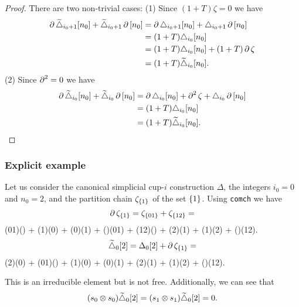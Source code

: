 \begin{proof}
	There are two non-trivial cases:
	(1) Since $(1+T) \zeta = 0$ we have
	\begin{align*}
		\operatorname{\partial} \widetilde\triangle_{i_0+1}[n_0] + \widetilde\triangle_{i_0+1} \operatorname{\partial} \,[n_0] &=
		\operatorname{\partial} \triangle_{i_0+1}[n_0] + \triangle_{i_0+1} \operatorname{\partial} \,[n_0] \\ &=
		(1+T)\triangle_{i_0}[n_0] \\ &=
		(1+T)\triangle_{i_0}[n_0] + (1+T) \operatorname{\partial} \zeta \\ &=
		(1+T)\widetilde\triangle_{i_0}[n_0] .
	\end{align*}
	(2) Since $\operatorname{\partial}^2 = 0$ we have
	\begin{align*}
		\operatorname{\partial} \widetilde\triangle_{i_0}[n_0] + \widetilde\triangle_{i_0} \operatorname{\partial} \,[n_0] &=
		\operatorname{\partial} \triangle_{i_0}[n_0] + \operatorname{\partial}^2 \zeta + \triangle_{i_0} \operatorname{\partial} \,[n_0] \\ &=
		(1+T)\triangle_{i_0}[n_0] \\ &=
		(1+T)\widetilde\triangle_{i_0}[n_0]. \qedhere
	\end{align*}
\end{proof}

\subsubsection{Explicit example}

Let us consider the canonical simplicial \mbox{cup-$i$} construction $\Delta$, the integers $i_0 = 0$ and $n_0 = 2$, and the partition chain $\zeta_{\{1\}}$ of the set $\{1\}$.
Using \texttt{comch} we have
\[
\operatorname{\partial} \zeta_{\{1\}} = \zeta_{\{01\}} + \zeta_{\{12\}} =
\]
\noindent
{\ttfamily (01)() + (1)(0) + (0)(1) + ()(01) + (12)() + (2)(1) + (1)(2) + ()(12).}
\[
\widetilde\triangle_0[2] = \Delta_0[2] + \operatorname{\partial} \zeta_{\{1\}} =
\]
\noindent
{\ttfamily (2)(0) + (01)() + (1)(0) + (0)(1) + (2)(1) + (1)(2) + ()(12)}.

\medskip \noindent This is an irreducible element but is not free.
Additionally, we can see that
\[
(s_0 \otimes s_0)\widetilde\triangle_0[2] = (s_1 \otimes s_1)\widetilde\triangle_0[2] = 0.
\]
